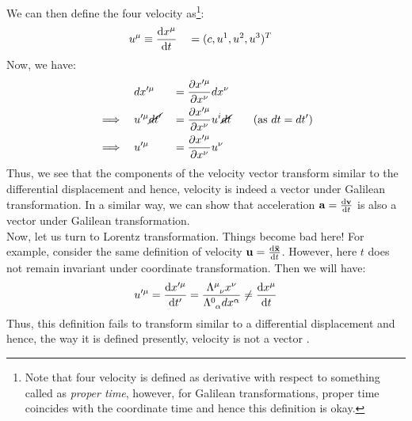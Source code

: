 We can then define the four velocity as\footnote{Note that four velocity is defined as derivative with respect to something called as \textit{proper time}, however, for Galilean transformations, proper time coincides with the coordinate time and hence this definition is okay.}:
\begin{alignat*}{3}
    u^\mu &\equiv \dv{x^\mu}{t}  &&= (c,u^1,u^2,u^3)^T
\end{alignat*}
Now, we have:
\begin{alignat*}{3}
   & dx'^\mu &&= \pdv{x'^\mu}{x^\nu}dx^\nu\\
    \implies \quad & u'^\mu \cancel{dt'} &&= \pdv{x'^\mu}{x^\nu}u^i \cancel{dt}\qquad \text{(as $dt = dt'$)}\\
    \implies \quad & u'^\mu  &&= \pdv{x'^\mu}{x^\nu}u^\nu
\end{alignat*}
Thus, we see that the components of the velocity vector transform similar to the differential displacement and hence, velocity is indeed a vector under Galilean transformation. In a similar way, we can show that acceleration $\vb{a} = \dv{\vb{v}}{t}$ is also a vector under Galilean transformation.\\[0.2cm] Now, let us turn to Lorentz transformation. Things become bad here! For example, consider the same definition of velocity $\vb{u} = \dv{\vb{\bar{x}}}{t}$. However, here $t$ does not remain invariant under coordinate transformation. Then we will have:
$$u'^\mu = \dv{x'^\mu}{t'} = \frac{\tensor{\Lambda}{^\mu _\nu}x^\nu}{\tensor{\Lambda}{^0 _\alpha}dx^\alpha}\neq \dv{x^\mu}{t}$$
Thus, this definition fails to transform similar to a differential displacement and hence, the way it is defined presently, velocity is not a vector .
